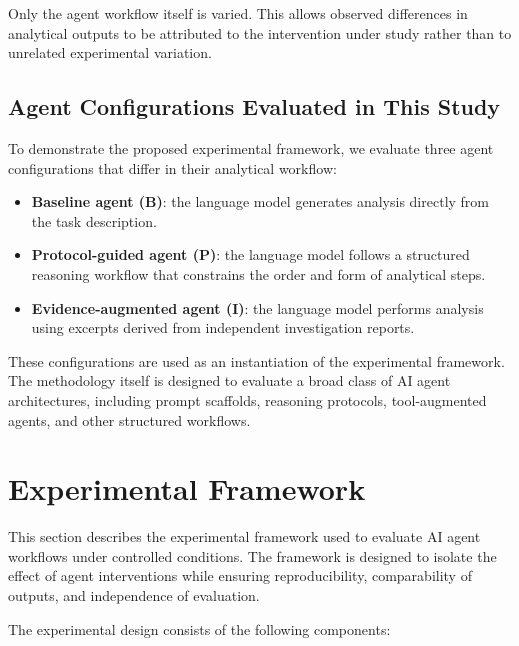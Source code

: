 Only the agent workflow itself is varied. This allows observed differences
in analytical outputs to be attributed to the intervention under study
rather than to unrelated experimental variation.

\subsection{Agent Configurations Evaluated in This Study}

To demonstrate the proposed experimental framework, we evaluate three agent
configurations that differ in their analytical workflow:

\begin{itemize}

\item \textbf{Baseline agent (B)}: the language model generates analysis
directly from the task description.

\item \textbf{Protocol-guided agent (P)}: the language model follows a
structured reasoning workflow that constrains the order and form of
analytical steps.

\item \textbf{Evidence-augmented agent (I)}: the language model performs
analysis using excerpts derived from independent investigation reports.

\end{itemize}

These configurations are used as an instantiation of the experimental
framework. The methodology itself is designed to evaluate a broad class of
AI agent architectures, including prompt scaffolds, reasoning protocols,
tool-augmented agents, and other structured workflows.
\section{Experimental Framework}

This section describes the experimental framework used to evaluate AI agent
workflows under controlled conditions. The framework is designed to isolate
the effect of agent interventions while ensuring reproducibility,
comparability of outputs, and independence of evaluation.

The experimental design consists of the following components:

